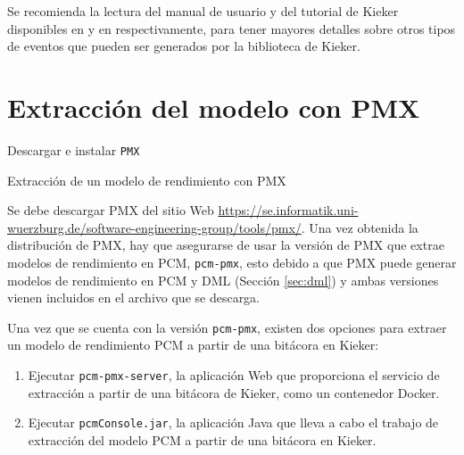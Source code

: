 
Se recomienda la lectura del manual de usuario y del tutorial de Kieker disponibles en \cite{kieker-user-guide} y en \cite{kieker-icpe-tutorial-2014} respectivamente, para tener mayores detalles sobre otros tipos de eventos que pueden ser generados por la biblioteca de Kieker.

\section{Extracción del modelo con PMX}

\begin{singlespace}
\begin{algorithm}[H]
\SetAlgoLined

Descargar e instalar \texttt{PMX}\;
\caption{Extracción de un modelo de rendimiento con PMX}
\end{algorithm}
\end{singlespace}


Se debe descargar PMX del sitio Web \url{https://se.informatik.uni-wuerzburg.de/software-engineering-group/tools/pmx/}. Una vez obtenida la distribución de PMX, hay que asegurarse de usar la versión de PMX que extrae modelos de rendimiento en PCM, \texttt{pcm-pmx}, esto debido a que PMX puede generar modelos de rendimiento en PCM y DML (Sección \ref{sec:dml}) y ambas versiones vienen incluidos en el archivo que se descarga.

Una vez que se cuenta con la versión \texttt{pcm-pmx}, existen dos opciones para extraer un modelo de rendimiento PCM a partir de una bitácora en Kieker:
\begin{enumerate}
    \item Ejecutar \texttt{pcm-pmx-server}, la aplicación Web que proporciona el servicio de extracción a partir de una bitácora de Kieker, como un contenedor Docker.
    \item Ejecutar \texttt{pcmConsole.jar}, la aplicación Java que lleva a cabo el trabajo de extracción del modelo PCM a partir de una bitácora en Kieker.
\end{enumerate}

